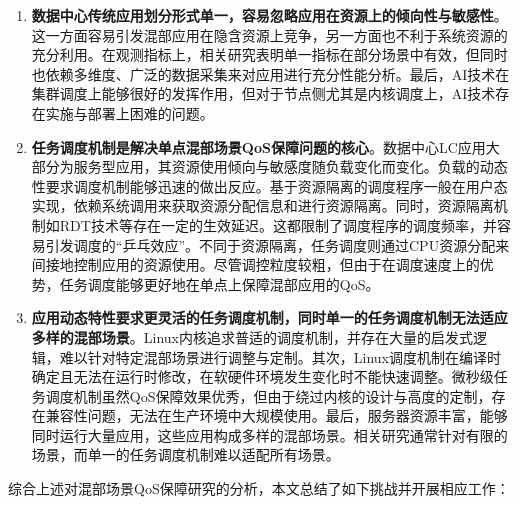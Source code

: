 \begin{enumerate}

    \item \textbf{数据中心传统应用划分形式单一，容易忽略应用在资源上的倾向性与敏感性}。这一方面容易引发混部应用在隐含资源上竞争，另一方面也不利于系统资源的充分利用。在观测指标上，相关研究表明单一指标在部分场景中有效，但同时也依赖多维度、广泛的数据采集来对应用进行充分性能分析。最后，AI技术在集群调度上能够很好的发挥作用，但对于节点侧尤其是内核调度上，AI技术存在实施与部署上困难的问题。
    
    \item \textbf{任务调度机制是解决单点混部场景QoS保障问题的核心}。数据中心LC应用大部分为服务型应用，其资源使用倾向与敏感度随负载变化而变化。负载的动态性要求调度机制能够迅速的做出反应。基于资源隔离的调度程序一般在用户态实现，依赖系统调用来获取资源分配信息和进行资源隔离。同时，资源隔离机制如RDT技术等存在一定的生效延迟。这都限制了调度程序的调度频率，并容易引发调度的“乒乓效应”。不同于资源隔离，任务调度则通过CPU资源分配来间接地控制应用的资源使用。尽管调控粒度较粗，但由于在调度速度上的优势，任务调度能够更好地在单点上保障混部应用的QoS。
    
    \item \textbf{应用动态特性要求更灵活的任务调度机制，同时单一的任务调度机制无法适应多样的混部场景}。Linux内核追求普适的调度机制，并存在大量的启发式逻辑，难以针对特定混部场景进行调整与定制。其次，Linux调度机制在编译时确定且无法在运行时修改，在软硬件环境发生变化时不能快速调整。微秒级任务调度机制虽然QoS保障效果优秀，但由于绕过内核的设计与高度的定制，存在兼容性问题，无法在生产环境中大规模使用。最后，服务器资源丰富，能够同时运行大量应用，这些应用构成多样的混部场景。相关研究通常针对有限的场景，而单一的任务调度机制难以适配所有场景。

\end{enumerate}

综合上述对混部场景QoS保障研究的分析，本文总结了如下挑战并开展相应工作：

